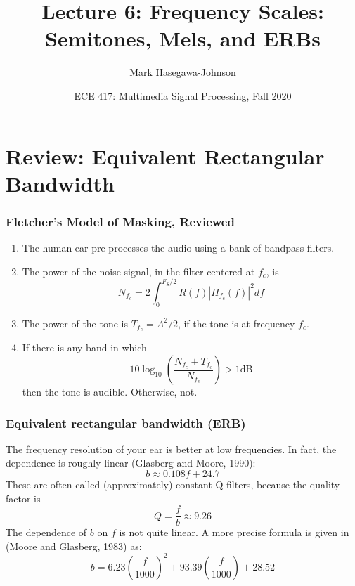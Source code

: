 \documentclass{beamer}
\title{Lecture 6: Frequency Scales: Semitones, Mels, and ERBs}
\author{Mark Hasegawa-Johnson}
\date{ECE 417: Multimedia Signal Processing, Fall 2020}
\begin{document}
\begin{frame}
  \maketitle
\end{frame}

\begin{frame}
  \tableofcontents
\end{frame}

\section[Review]{Review: Equivalent Rectangular Bandwidth}
\setcounter{subsection}{1}

\begin{frame}
  \frametitle{Fletcher's Model of Masking, Reviewed}

  \begin{enumerate}
  \item The human ear pre-processes  the audio using a bank of bandpass filters.
  \item The power of the noise signal, in the  filter centered at $f_c$, is
    \[
    N_{f_c}=2\int_{0}^{F_S/2} R(f) |H_{f_c}(f)|^2 df
    \]
  \item The power of the tone is $T_{f_c}=A^2/2$, if the tone is at frequency $f_c$.
  \item If there is any band in which
    \[
    10\log_{10}\left(\frac{N_{f_c}+T_{f_c}}{N_{f_c}}\right)>1\mbox{dB}
    \]
    then the tone is audible.  Otherwise, not.
  \end{enumerate}
\end{frame}

\begin{frame}
  \frametitle{Equivalent rectangular bandwidth (ERB)}

  The frequency resolution of your ear is better at low frequencies.
  In fact, the dependence is roughly linear (Glasberg and Moore,
  1990):
  \[
  b \approx 0.108 f + 24.7
  \]
  These are often called (approximately) constant-Q filters, because
  the quality factor is
  \[
  Q = \frac{f}{b} \approx 9.26
  \]
  The dependence of $b$ on $f$ is not quite linear.  A more precise
  formula is given in (Moore and Glasberg, 1983) as:
  \[
  b = 6.23\left(\frac{f}{1000}\right)^2 + 93.39\left(\frac{f}{1000}\right)+28.52
  \]
\end{frame}
\end{document}
